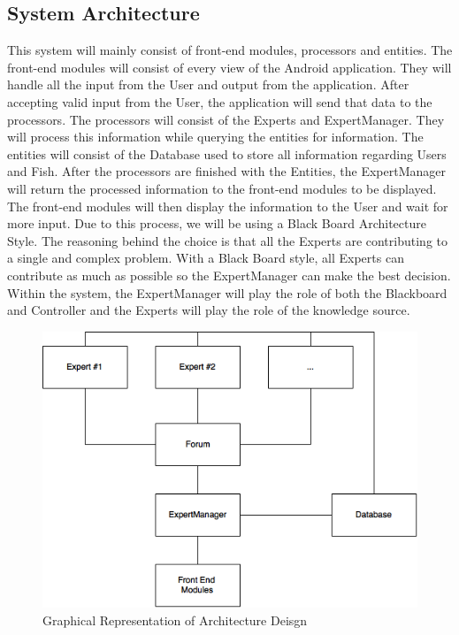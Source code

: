 \documentclass[]{article}
\begin{document}
\subsection{System Architecture}
\label{sub:system_architecture}
This system will mainly consist of front-end modules, processors and entities.
The front-end modules will consist of every view of the Android application. They will handle all the input from the User and output from the application. After accepting valid input from the User, the application will send that data to the processors. The processors will consist of the Experts and ExpertManager. They will process this information while querying the entities for information. The entities will consist of the Database used to store all information regarding Users and Fish. After the processors are finished with the Entities, the ExpertManager will return the processed information to the front-end modules to be displayed. The front-end modules will then display the information to the User and wait for more input. Due to this process, we will be using a Black Board Architecture Style. The reasoning behind the choice is that all the Experts are contributing to a single and complex problem. With a Black Board style, all Experts can contribute as much as possible so the ExpertManager can make the best decision. Within the system, the ExpertManager will play the role of both the Blackboard and Controller and the Experts will play the role of the knowledge source.

\begin{figure}
\includegraphics[width=\textwidth]{ArchDesign}
\caption{Graphical Representation of Architecture Deisgn}
\end{figure}
\end{document}
